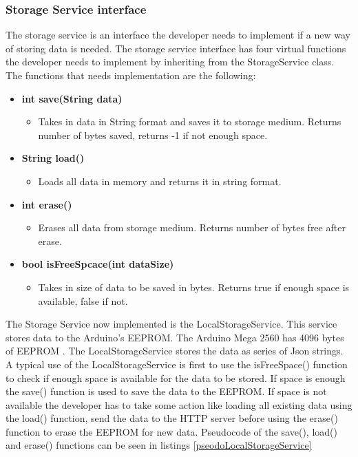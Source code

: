 \subsubsection{Storage Service interface}
The storage service is an interface the developer needs to implement if a new way of
storing data is needed. The storage service interface has four virtual functions the developer needs to implement by inheriting from the StorageService class. The functions that needs implementation are the following:
\begin{itemize}
    \item \textbf{int save(String data)}
        \begin{itemize}
            \item Takes in data in String format and saves it to storage medium. 
                  Returns number of bytes saved, returns -1 if not enough space.
        \end{itemize}
    \item \textbf{String load()}
        \begin{itemize}
            \item Loads all data in memory and returns it in string format.
        \end{itemize}
    \item \textbf{int erase()}
        \begin{itemize}
            \item Erases all data from storage medium. Returns number of bytes
                  free after erase.
        \end{itemize}
    \item \textbf{bool isFreeSpcace(int dataSize)}
        \begin{itemize}
            \item Takes in size of data to be saved in bytes. Returns true if enough 
                  space is available, false if not.
        \end{itemize}
\end{itemize}
The Storage Service now implemented is the LocalStorageService. This service stores data 
to the Arduino's EEPROM. The Arduino Mega 2560 has 4096 bytes of 
EEPROM \cite{arduinoMega}. The LocalStorageService stores the data as series of Json 
strings. A typical use of the LocalStorageService is first to use the isFreeSpace() function to check if enough space is available for the data to be stored. If space is enough the save() function is used to save the data to the EEPROM. If space is not available the developer has to take some action like loading all existing data using the load() function, send the data to the HTTP server before using the erase() function to erase the EEPROM for new data. Pseudocode of the save(), load() and erase() functions can be seen in listings \ref{pseodoLocalStorageService}

